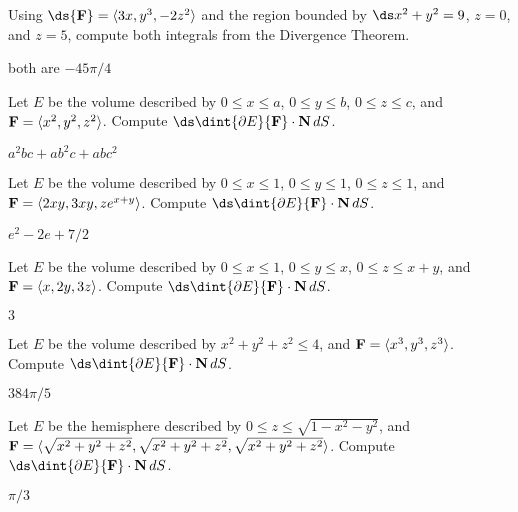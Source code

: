 \begin{exercises}

\begin{exercise} Using $\ds{\bf F}=\langle 3x,y^3,-2z^2\rangle$ and the
region bounded by $\ds x^2+y^2=9$, $z=0$, and $z=5$, compute both
integrals from the Divergence Theorem.
\begin{answer} both are $-45\pi/4$
\end{answer}\end{exercise}

\begin{exercise} Let $E$ be the volume described by 
$0\le x\le a$, $0\le y\le b$, $0\le z\le c$, and 
${\bf F}= \langle x^2,y^2,z^2\rangle$. Compute
$\ds\dint{\partial E} {\bf F}\cdot {\bf N}\,dS$.
\begin{answer} $a^2bc+ab^2c+abc^2$
\end{answer}\end{exercise}

\begin{exercise} Let $E$ be the volume described by 
$0\le x\le 1$, $0\le y\le 1$, $0\le z\le 1$, and 
${\bf F}= \langle 2xy,3xy,ze^{x+y}\rangle$. Compute
$\ds\dint{\partial E} {\bf F}\cdot {\bf N}\,dS$.
\begin{answer} $e^2-2e+7/2$
\end{answer}\end{exercise}

\begin{exercise} Let $E$ be the volume described by 
$0\le x\le 1$, $0\le y\le x$, $0\le z\le x+y$, and 
${\bf F}= \langle x,2y,3z\rangle$. Compute
$\ds\dint{\partial E} {\bf F}\cdot {\bf N}\,dS$.
\begin{answer} $3$
\end{answer}\end{exercise}

\begin{exercise} Let $E$ be the volume described by 
$x^2+y^2+z^2\le 4$, and 
${\bf F}= \langle x^3,y^3,z^3\rangle$. Compute
$\ds\dint{\partial E} {\bf F}\cdot {\bf N}\,dS$.
\begin{answer} $384\pi/5$
\end{answer}\end{exercise}

\begin{exercise} Let $E$ be the hemisphere described by 
$0\le z\le \sqrt{1-x^2-y^2}$, and \hfill\break
${\bf F}= \langle \sqrt{x^2+y^2+z^2},\sqrt{x^2+y^2+z^2},
\sqrt{x^2+y^2+z^2}\rangle$. Compute
$\ds\dint{\partial E} {\bf F}\cdot {\bf N}\,dS$.
\begin{answer} $\pi/3$
\end{answer}\end{exercise}


\end{exercises}
